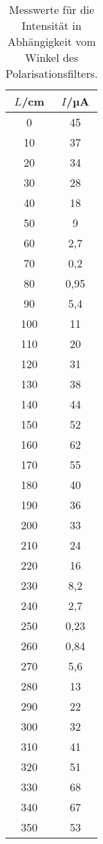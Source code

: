 \begin{table}[htp]
	\begin{center}
    \caption{Messwerte für die Intensität in Abhängigkeit vom Winkel des Polarisationsfilters.}
    \label{tab:polarisation}
		\begin{tabular}{cc}
		\toprule
			{$L$/cm} & {$I$/µA}\\
			\midrule
			0 & 45\\
			10 & 37\\
			20 & 34\\
			30 & 28\\
			40 & 18\\
			50 & 9\\
			60 & 2,7\\
			70 & 0,2\\
			80 & 0,95\\
			90 & 5,4\\
			100 & 11\\
			110 & 20\\
			120 & 31\\
			130 & 38\\
			140 & 44\\
			150 & 52\\
			160 & 62\\
			170 & 55\\
			180 & 40\\
			190 & 36\\
			200 & 33\\
			210 & 24\\
			220 & 16\\
			230 & 8,2\\
			240 & 2,7\\
			250 & 0,23\\
			260 & 0,84\\
			270 & 5,6\\
			280 & 13\\
			290 & 22\\
			300 & 32\\
			310 & 41\\
			320 & 51\\
			330 & 68\\
			340 & 67\\
			350 & 53\\
		\bottomrule
		\end{tabular}
	\end{center}
\end{table}
